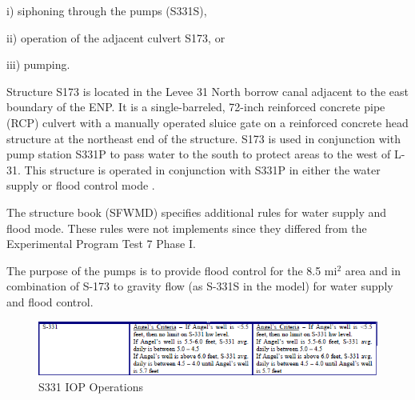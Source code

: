 \begin{packed_items}
\item i) siphoning through the pumps (S331S),
\item ii) operation of the adjacent culvert S173, or
\item iii) pumping.
\end{packed_items}

Structure S173 is located in the Levee 31 North borrow canal adjacent to the east boundary of the ENP. It is a single-barreled, 72-inch reinforced concrete pipe (RCP) culvert with a manually operated sluice gate on a reinforced concrete head structure at the northeast end of the structure. S173 is used in conjunction with pump station S331P to pass water to the south to protect areas to the west of L-31. This structure is operated in conjunction with S331P in either the water supply or flood control mode .

The structure book (SFWMD) specifies additional rules for water supply and flood mode. These rules were not implements since they differed from the Experimental Program Test 7 Phase I.

The purpose of the pumps is to provide flood control for the 8.5 mi$^2$ area and in combination of S-173 to gravity flow (as S-331S in the model) for water supply and flood control.

\begin{figure}[!h]
  \begin{center}
  \includegraphics[width=6.5in]{../figs/S331_IOPops.png}
  \caption{S331 IOP Operations}
  \label{fig:S331iop}
  \end{center}
\end{figure}




